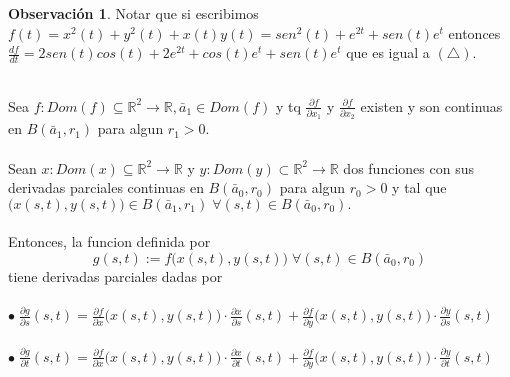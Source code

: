 \documentclass{article}
\theoremstyle{definition}
\newtheorem*{obs}{Observación}
\theoremstyle{remark}
\newcommand\bl{$\bullet\;$}
\begin{document}
\begin{obs}
  Notar que si escribimos \mbox{$f(t)=x^2(t)+y^2(t)+x(t)y(t)=sen^2(t)+e^{2t}+sen(t)e^t$} entonces $\frac{df}{dt}=2sen(t)cos(t)+2e^{2t}+cos(t)e^t+sen(t)e^t$ que es igual a \textcolor{rojop2}{$(\triangle)$}. 
\end{obs}\pagebreak
\begin{teo}\;\\
Sea $f: Dom(f) \subseteq \mathbb{R}^2 \to \mathbb{R}, \bar{a}_1 \in Dom(f)$ y tq $\frac{\partial f}{\partial x_1}$ y $\frac{\partial f}{\partial x_2}$ existen y son continuas en $B(\bar{a}_1,r_1)$ para algun $r_1>0$. \\\\Sean $ x : Dom(x) \subseteq \mathbb{R}^2 \to \mathbb{R}$ y $y : Dom(y) \subset \mathbb{R}^2 \to \mathbb{R}$ dos funciones con sus derivadas parciales continuas en $B(\bar{a}_0,r_0)$ para algun $r_0>0$ y tal que $\big(x(s,t),y(s,t)\big) \in B(\bar{a}_1,r_1) \; \forall (s,t) \in B(\bar{a}_0,r_0).$ \\\\ Entonces, la funcion definida por $$ g(s,t):=f\big(x(s,t),y(s,t)\big) \; \forall (s,t) \in B(\bar{a}_0,r_0)$$ tiene derivadas parciales dadas por \\\\ 
\bl $\frac{\partial g}{\partial s}(s,t)=\frac{\partial f}{\partial x}\big(x(s,t),y(s,t)\big)\cdot \frac{\partial x}{\partial s}(s,t)+\frac{\partial f}{\partial y}\big(x(s,t),y(s,t)\big)\cdot\frac{\partial y}{\partial s}(s,t)$ \\\\
\bl $\frac{\partial g}{\partial t}(s,t)=\frac{\partial f}{\partial x}\big(x(s,t),y(s,t)\big)\cdot \frac{\partial x}{\partial t}(s,t)+\frac{\partial f}{\partial y}\big(x(s,t),y(s,t)\big)\cdot\frac{\partial y}{\partial t}(s,t)$
\end{teo}
\begin{figure}[h]
\centering
\def\svgwidth{1\textwidth}
\makebox[\textwidth]{
}
\end{figure} \pagebreak
\end{document}
